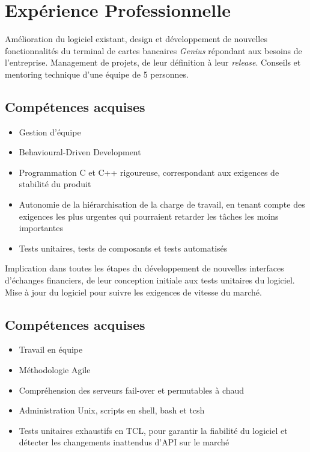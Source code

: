 \documentclass{cv}
\begin{document}
\iffalse
\contactfr{adresse ligne 1}
          {adresse ligne 2}
          {adresse ligne 3}
          {...@.........}
          {+phone~number}
\fi

\section{Expérience Professionnelle}
{Amélioration du logiciel existant, design et développement de nouvelles fonctionnalités du terminal de cartes bancaires \textit{Genius} répondant aux besoins de l'entreprise. Management de projets, de leur définition à leur \textit{release}. Conseils et mentoring technique d'une équipe de 5 personnes.}
\subsection{Compétences acquises}
\begin{itemize}
    \item {Gestion d'équipe}
    \item {Behavioural-Driven Development}
    \item {Programmation C et C++ rigoureuse, correspondant aux exigences de stabilité du produit}
    \item {Autonomie de la hiérarchisation de la charge de travail, en tenant compte des exigences les plus urgentes qui pourraient retarder les tâches les moins importantes}
    \item {Tests unitaires, tests de composants et tests automatisés}
\end{itemize}

{Implication dans toutes les étapes du développement de nouvelles interfaces d'échanges financiers, de leur conception initiale aux tests unitaires du logiciel. Mise à jour du logiciel pour suivre les exigences de vitesse du marché.}
\subsection{Compétences acquises}
\begin{itemize}
    \item {Travail en équipe}
    \item {Méthodologie Agile}
    \item {Compréhension des serveurs fail-over et permutables à chaud}
    \item {Administration Unix, scripts en shell, bash et tcsh}
    \item {Tests unitaires exhaustifs en TCL, pour garantir la fiabilité du logiciel et détecter les changements inattendus d'API sur le marché}
\end{itemize}
\end{document}
